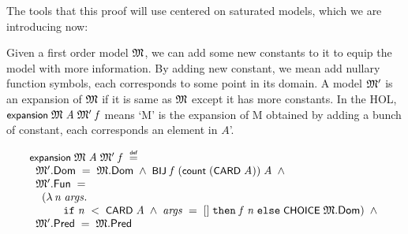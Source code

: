 \documentclass[letterpaper]{article}
\renewcommand{\HOLConst}[1]{{\textsf{\upshape\small #1}}}
\renewcommand{\HOLinline}[1]{\ensuremath{#1}}
\renewcommand{\HOLKeyword}[1]{\texttt{#1}}
\newenvironment{holmath}{\begin{displaymath}\begin{array}{l}}{\end{array}\end{displaymath}\ignorespacesafterend}
\begin{document}
The tools that this proof will use centered on saturated models, which we are introducing now:

Given a first order model \HOLinline{\HOLFreeVar{\ensuremath{\mathfrak{M}}}}, we can add some new constants to it to equip the model with more information. By adding new constant, we mean add nullary function symbols, each corresponds to some point in its domain. A model \HOLinline{\HOLFreeVar{\ensuremath{\mathfrak{M}'}}} is an expansion of \HOLinline{\HOLFreeVar{\ensuremath{\mathfrak{M}}}} if it is same as \HOLinline{\HOLFreeVar{\ensuremath{\mathfrak{M}}}} except it has more constants. In the HOL, \HOLinline{\HOLConst{expansion}\;\HOLFreeVar{\ensuremath{\mathfrak{M}}}\;\HOLFreeVar{A}\;\HOLFreeVar{\ensuremath{\mathfrak{M}'}}\;\HOLFreeVar{f}} means `M' is the expansion of M obtained by adding a bunch of constant, each corresponds an element in $A$'. 

\begin{holmath}
  \HOLConst{expansion}\;\HOLFreeVar{\ensuremath{\mathfrak{M}}}\;\HOLFreeVar{A}\;\HOLFreeVar{\ensuremath{\mathfrak{M}'}}\;\HOLFreeVar{f}\;\HOLSymConst{\HOLTokenDefEquality{}}\\
\;\;\HOLFreeVar{\ensuremath{\mathfrak{M}'}}.\HOLFieldName{Dom}\;\HOLSymConst{=}\;\HOLFreeVar{\ensuremath{\mathfrak{M}}}.\HOLFieldName{Dom}\;\HOLSymConst{\HOLTokenConj{}}\;\HOLConst{BIJ}\;\HOLFreeVar{f}\;(\HOLConst{count}\;(\HOLConst{CARD}\;\HOLFreeVar{A}))\;\HOLFreeVar{A}\;\HOLSymConst{\HOLTokenConj{}}\\
\;\;\HOLFreeVar{\ensuremath{\mathfrak{M}'}}.\HOLFieldName{Fun}\;\HOLSymConst{=}\\
\;\;\;\;(\HOLTokenLambda{}\HOLBoundVar{n}\;\HOLBoundVar{args}.\\
\;\;\;\;\;\;\;\;\;\;\;\HOLKeyword{if}\;\HOLBoundVar{n}\;\HOLSymConst{\HOLTokenLt{}}\;\HOLConst{CARD}\;\HOLFreeVar{A}\;\HOLSymConst{\HOLTokenConj{}}\;\HOLBoundVar{args}\;\HOLSymConst{=}\;[]\;\HOLKeyword{then}\;\HOLFreeVar{f}\;\HOLBoundVar{n}\;\HOLKeyword{else}\;\HOLConst{CHOICE}\;\HOLFreeVar{\ensuremath{\mathfrak{M}}}.\HOLFieldName{Dom})\;\HOLSymConst{\HOLTokenConj{}}\\
\;\;\HOLFreeVar{\ensuremath{\mathfrak{M}'}}.\HOLFieldName{Pred}\;\HOLSymConst{=}\;\HOLFreeVar{\ensuremath{\mathfrak{M}}}.\HOLFieldName{Pred}
\end{holmath}
\end{document}
